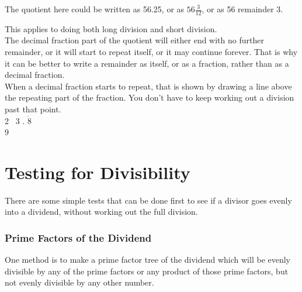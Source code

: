 \documentclass{article}
\begin{document}
\begin{center}
\end{center}

The quotient here could be written as 56.25, or as $56 \frac{3}{12}$, or as 56 remainder 3.

\newpage

This applies to doing both long division and short division.\\

The decimal fraction part of the quotient will either end with no further remainder, or it will start to repeat itself, or it may continue forever. That is why it can be better to write a remainder as itself, or as a fraction, rather than as a decimal fraction.\\

When a decimal fraction starts to repeat, that is shown by drawing a line above the repeating part of the fraction. You don't have to keep working out a division past that point.\\

\hspace{12ex} 2 \ 3 . $\dot{8}$\\
\vspace{1pt}
\hspace{10ex} 9\ 

\begin{center}
\end{center}

\pagebreak

\section{Testing for Divisibility}

There are some simple tests that can be done first to see if a divisor goes evenly into a dividend, without working out the full division.\\

\subsubsection*{Prime Factors of the Dividend}

One method is to make a prime factor tree of the dividend which will be evenly divisible by any of the prime factors or any product of those prime factors, but not evenly divisible by any other number.\\
\end{document}
